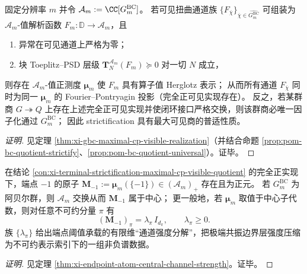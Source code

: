 \begin{conclusion}\label{con:xi-terminal-strictification-maximal-cp-visible-quotient}
固定分辨率 \(m\) 并令 \(\mathcal{A}_m:=\CC[G^{\mathrm{BC}}_m]\)。
若可见扭曲通道族 \(\{F_{\overline\chi}\}_{\overline\chi\in\widehat{G^{\mathrm{BC}}_m}}\) 可组装为 \(\mathcal{A}_m\)-值解析函数 \(F_m:\mathbb{D}\to\mathcal{A}_m\)，且
\begin{enumerate}
  \item 异常在可见通道上严格为零；
  \item 块 Toeplitz--PSD 层级 \(\mathbf{T}^{\mathcal{A}_m}_N(F_m)\succeq 0\) 对一切 \(N\) 成立，
\end{enumerate}
则存在 \(\mathcal{A}_m\)-值正测度 \(\boldsymbol\mu_m\) 使 \(F_m\) 具有算子值 Herglotz 表示；
从而所有通道 \(F_{\overline\chi}\) 同时为同一 \(\boldsymbol\mu_m\) 的 Fourier--Pontryagin 投影（完全正可见实现存在）。
反之，若某群商 \(G\twoheadrightarrow Q\) 上存在上述完全正可见实现并使闭环接口严格交换，则该群商必唯一因子化通过 \(G^{\mathrm{BC}}_m\)；
因此 strictification 具有最大可见商的普适性质。
\end{conclusion}
\begin{proof}[证明]
见定理 \ref{thm:xi-gbc-maximal-cp-visible-realization}（并结合命题 \ref{prop:pom-bc-quotient-strictify}、\ref{prop:pom-bc-quotient-universal}）。证毕。
\end{proof}



\begin{conclusion}\label{con:xi-terminal-endpoint-atom-channel-strength-spectrum}
在结论 \ref{con:xi-terminal-strictification-maximal-cp-visible-quotient} 的完全正实现下，端点 \(-1\) 的原子
\(
\mathbf{M}_{-1}:=\boldsymbol\mu_m(\{-1\})\in(\mathcal{A}_m)_+
\)
存在且为正元。
若 \(G^{\mathrm{BC}}_m\) 为阿贝尔群，则 \(\mathcal{A}_m\) 交换从而 \(\mathbf{M}_{-1}\) 属于中心；
更一般地，若 \(\boldsymbol\mu_m\) 取值于中心子代数，则对任意不可约分量 \(\pi\) 有
\[
(\mathbf{M}_{-1})_\pi=\lambda_\pi\,I_{d_\pi},
\qquad
\lambda_\pi\ge 0.
\]
族 \(\{\lambda_\pi\}\) 给出端点阈值承载的有限维“通道强度分解”，把极端共振边界层强度压缩为不可约表示索引下的一组非负谱数据。
\end{conclusion}
\begin{proof}[证明]
见定理 \ref{thm:xi-endpoint-atom-central-channel-strength}。证毕。
\end{proof}

